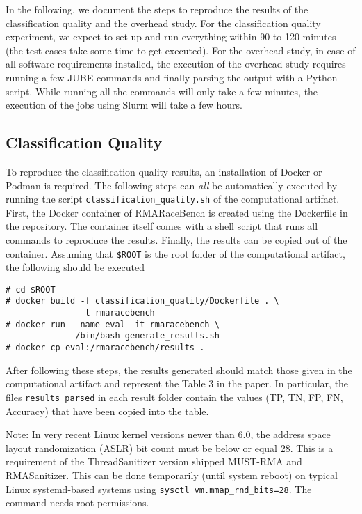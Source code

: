 \documentclass[twoside]{article}
\begin{document}
In the following, we document the steps to reproduce the results of the classification quality and the overhead study.
For the classification quality experiment, we expect to set up and run everything within 90 to 120 minutes (the test cases take some time to get executed).
For the overhead study, in case of all software requirements installed, the execution of the overhead study requires running a few JUBE commands and finally parsing the output with a Python script. While running all the commands will only take a few minutes, the execution of the jobs using Slurm will take a few hours.

\subsection*{Classification Quality}
To reproduce the classification quality results, an installation of Docker or Podman is required.
The following steps can \textit{all} be automatically executed by running the script \texttt{classification\_quality.sh} of the computational artifact.
First, the Docker container of RMARaceBench is created using the Dockerfile in the repository.
The container itself comes with a shell script that runs all commands to reproduce the results.
Finally, the results can be copied out of the container.
Assuming that \texttt{\$ROOT} is the root folder of the computational artifact, the following should be executed
{
\small
\begin{verbatim}
# cd $ROOT
# docker build -f classification_quality/Dockerfile . \
               -t rmaracebench
# docker run --name eval -it rmaracebench \ 
              /bin/bash generate_results.sh
# docker cp eval:/rmaracebench/results .
\end{verbatim}
}

After following these steps, the results generated should match those given in the computational artifact and represent the Table 3 in the paper.
In particular, the files \texttt{results\_parsed} in each result folder contain the values (TP, TN, FP, FN, Accuracy) that have been copied into the table.

Note: In very recent Linux kernel versions newer than 6.0, the address space layout randomization (ASLR) bit count must be below or equal 28. This is a requirement of the ThreadSanitizer version shipped MUST-RMA and RMASanitizer. This can be done temporarily (until system reboot) on typical Linux systemd-based systems using \texttt{sysctl vm.mmap\_rnd\_bits=28}. The command needs root permissions. 
\end{document}
